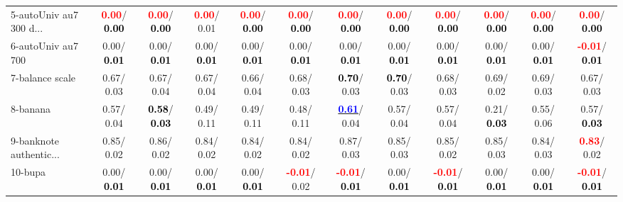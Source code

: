 \begin{table}[h]
\begin{center}
{\begin{tabular}{lc|c|c|c|c|c|c|c|c|c|c}
5-autoUniv au7 300 d... & \textcolor{red}{\textbf{  0.00}}/\textcolor{black}{\textbf{  0.00}} & \textcolor{red}{\textbf{  0.00}}/\textcolor{black}{\textbf{  0.00}} & \textcolor{red}{\textbf{  0.00}}/  0.01 & \textcolor{red}{\textbf{  0.00}}/\textcolor{black}{\textbf{  0.00}} & \textcolor{red}{\textbf{  0.00}}/\textcolor{black}{\textbf{  0.00}} & \textcolor{red}{\textbf{  0.00}}/\textcolor{black}{\textbf{  0.00}} & \textcolor{red}{\textbf{  0.00}}/\textcolor{black}{\textbf{  0.00}} & \textcolor{red}{\textbf{  0.00}}/\textcolor{black}{\textbf{  0.00}} & \textcolor{red}{\textbf{  0.00}}/\textcolor{black}{\textbf{  0.00}} & \textcolor{red}{\textbf{  0.00}}/\textcolor{black}{\textbf{  0.00}} & \textcolor{red}{\textbf{  0.00}}/\textcolor{black}{\textbf{  0.00}} \\
6-autoUniv au7 700 &   0.00/\textcolor{black}{\textbf{  0.01}} &   0.00/\textcolor{black}{\textbf{  0.01}} &   0.00/\textcolor{black}{\textbf{  0.01}} &   0.00/\textcolor{black}{\textbf{  0.01}} &   0.00/\textcolor{black}{\textbf{  0.01}} &   0.00/\textcolor{black}{\textbf{  0.01}} &   0.00/\textcolor{black}{\textbf{  0.01}} &   0.00/\textcolor{black}{\textbf{  0.01}} &   0.00/\textcolor{black}{\textbf{  0.01}} &   0.00/\textcolor{black}{\textbf{  0.01}} & \textcolor{red}{\textbf{ -0.01}}/\textcolor{black}{\textbf{  0.01}} \\
7-balance scale &   0.67/  0.03 &   0.67/  0.04 &   0.67/  0.04 &   0.66/  0.04 &   0.68/  0.03 & \textcolor{black}{\textbf{  0.70}}/  0.03 & \textcolor{black}{\textbf{  0.70}}/  0.03 &   0.68/  0.03 &   0.69/  0.02 &   0.69/  0.03 &   0.67/  0.03 \\ \hline
8-banana &   0.57/  0.04 & \textcolor{black}{\textbf{  0.58}}/\textcolor{black}{\textbf{  0.03}} &   0.49/  0.11 &   0.49/  0.11 &   0.48/  0.11 & \underline{\textcolor{blue}{\textbf{  0.61}}}/  0.04 &   0.57/  0.04 &   0.57/  0.04 &   0.21/\textcolor{black}{\textbf{  0.03}} &   0.55/  0.06 &   0.57/\textcolor{black}{\textbf{  0.03}} \\
9-banknote authentic... &   0.85/  0.02 &   0.86/  0.02 &   0.84/  0.02 &   0.84/  0.02 &   0.84/  0.02 &   0.87/  0.03 &   0.85/  0.03 &   0.85/  0.02 &   0.85/  0.03 &   0.84/  0.03 & \textcolor{red}{\textbf{  0.83}}/  0.02 \\
10-bupa &   0.00/\textcolor{black}{\textbf{  0.01}} &   0.00/\textcolor{black}{\textbf{  0.01}} &   0.00/\textcolor{black}{\textbf{  0.01}} &   0.00/\textcolor{black}{\textbf{  0.01}} & \textcolor{red}{\textbf{ -0.01}}/  0.02 & \textcolor{red}{\textbf{ -0.01}}/\textcolor{black}{\textbf{  0.01}} &   0.00/\textcolor{black}{\textbf{  0.01}} & \textcolor{red}{\textbf{ -0.01}}/\textcolor{black}{\textbf{  0.01}} &   0.00/\textcolor{black}{\textbf{  0.01}} &   0.00/\textcolor{black}{\textbf{  0.01}} & \textcolor{red}{\textbf{ -0.01}}/\textcolor{black}{\textbf{  0.01}} \\

\end{tabular}}
\end{center}
\end{table}
